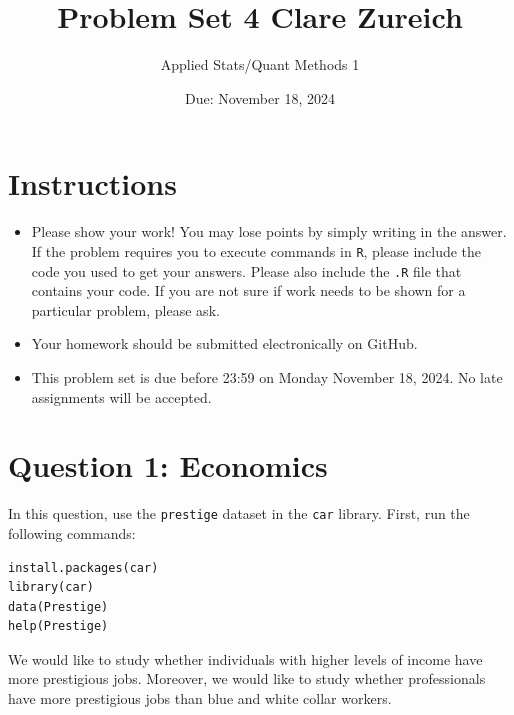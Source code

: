 \documentclass[12pt,letterpaper]{article}
\title{Problem Set 4 Clare Zureich}
\date{Due: November 18, 2024}
\author{Applied Stats/Quant Methods 1}
\begin{document}
	\maketitle
	\section*{Instructions}
	\begin{itemize}
		\item Please show your work! You may lose points by simply writing in the answer. If the problem requires you to execute commands in \texttt{R}, please include the code you used to get your answers. Please also include the \texttt{.R} file that contains your code. If you are not sure if work needs to be shown for a particular problem, please ask.
		\item Your homework should be submitted electronically on GitHub.
		\item This problem set is due before 23:59 on Monday November 18, 2024. No late assignments will be accepted.
	\end{itemize}



	\vspace{.5cm}
\section*{Question 1: Economics}
\vspace{.25cm}
\noindent 	
In this question, use the \texttt{prestige} dataset in the \texttt{car} library. First, run the following commands:

\begin{verbatim}
install.packages(car)
library(car)
data(Prestige)
help(Prestige)
\end{verbatim} 

	

\noindent We would like to study whether individuals with higher levels of income have more prestigious jobs. Moreover, we would like to study whether professionals have more prestigious jobs than blue and white collar workers.
\end{document}
